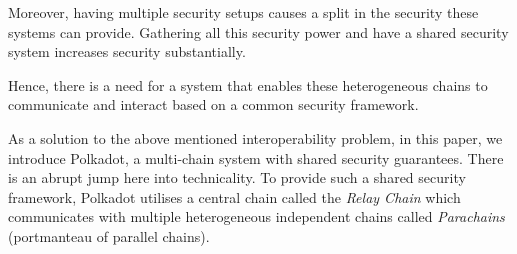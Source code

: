 Moreover, having multiple security setups causes a split in the security these systems can provide. Gathering all this security power and have a shared security system increases security substantially.

Hence, there is a need for a system that enables these heterogeneous chains to communicate and interact based on a common security framework.

As a solution to the above mentioned interoperability problem, in this paper, we introduce Polkadot, a multi-chain system with shared security guarantees. There is an abrupt jump here into technicality. To provide such a shared security framework, Polkadot utilises a central chain called the \emph{Relay Chain} which communicates with multiple heterogeneous independent chains called \emph{Parachains} (portmanteau of parallel chains).





